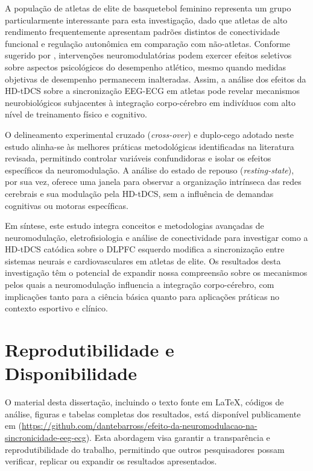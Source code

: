 A população de atletas de elite de basquetebol feminino representa um grupo particularmente interessante para esta investigação, dado que atletas de alto rendimento frequentemente apresentam padrões distintos de conectividade funcional e regulação autonômica em comparação com não-atletas. Conforme sugerido por , intervenções neuromodulatórias podem exercer efeitos seletivos sobre aspectos psicológicos do desempenho atlético, mesmo quando medidas objetivas de desempenho permanecem inalteradas. Assim, a análise dos efeitos da HD-tDCS sobre a sincronização EEG-ECG em atletas pode revelar mecanismos neurobiológicos subjacentes à integração corpo-cérebro em indivíduos com alto nível de treinamento físico e cognitivo.

O delineamento experimental cruzado (\textit{cross-over}) e duplo-cego adotado neste estudo alinha-se às melhores práticas metodológicas identificadas na literatura revisada, permitindo controlar variáveis confundidoras e isolar os efeitos específicos da neuromodulação. A análise do estado de repouso (\textit{resting-state}), por sua vez, oferece uma janela para observar a organização intrínseca das redes cerebrais e sua modulação pela HD-tDCS, sem a influência de demandas cognitivas ou motoras específicas.

Em síntese, este estudo integra conceitos e metodologias avançadas de neuromodulação, eletrofisiologia e análise de conectividade para investigar como a HD-tDCS catódica sobre o DLPFC esquerdo modifica a sincronização entre sistemas neurais e cardiovasculares em atletas de elite. Os resultados desta investigação têm o potencial de expandir nossa compreensão sobre os mecanismos pelos quais a neuromodulação influencia a integração corpo-cérebro, com implicações tanto para a ciência básica quanto para aplicações práticas no contexto esportivo e clínico.

\section{Reprodutibilidade e Disponibilidade}
O material desta dissertação, incluindo o texto fonte em \LaTeX, códigos de análise, figuras e tabelas completas dos resultados, está disponível publicamente em \cite{barros2025repository} (\url{https://github.com/dantebarross/efeito-da-neuromodulacao-na-sincronicidade-eeg-ecg}). Esta abordagem visa garantir a transparência e reprodutibilidade do trabalho, permitindo que outros pesquisadores possam verificar, replicar ou expandir os resultados apresentados.